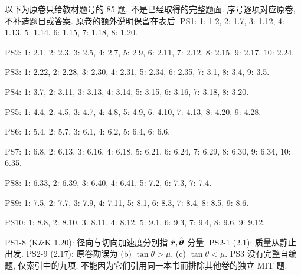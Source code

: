 以下为原卷只给教材题号的 85 题, 不是已经取得的完整题面. 序号逐项对应原卷, 不补造题目或答案. 原卷的额外说明保留在表后.
\noindent PS1: 1: 1.2, 2: 1.7, 3: 1.12, 4: 1.13, 5: 1.14, 6: 1.15, 7: 1.18, 8: 1.20.\par
\noindent PS2: 1: 2.1, 2: 2.3, 3: 2.5, 4: 2.7, 5: 2.9, 6: 2.11, 7: 2.12, 8: 2.15, 9: 2.17, 10: 2.24.\par
\noindent PS3: 1: 2.22, 2: 2.28, 3: 2.30, 4: 2.31, 5: 2.34, 6: 2.35, 7: 3.1, 8: 3.4, 9: 3.5.\par
\noindent PS4: 1: 3.7, 2: 3.11, 3: 3.13, 4: 3.14, 5: 3.15, 6: 3.16, 7: 3.18, 8: 3.20.\par
\noindent PS5: 1: 4.4, 2: 4.5, 3: 4.7, 4: 4.8, 5: 4.9, 6: 4.10, 7: 4.13, 8: 4.20, 9: 4.28.\par
\noindent PS6: 1: 5.4, 2: 5.7, 3: 6.1, 4: 6.2, 5: 6.4, 6: 6.6.\par
\noindent PS7: 1: 6.8, 2: 6.13, 3: 6.16, 4: 6.18, 5: 6.21, 6: 6.24, 7: 6.29, 8: 6.30, 9: 6.34, 10: 6.35.\par
\noindent PS8: 1: 6.33, 2: 6.39, 3: 6.40, 4: 6.41, 5: 7.2, 6: 7.3, 7: 7.4.\par
\noindent PS9: 1: 7.5, 2: 7.7, 3: 7.9, 4: 7.11, 5: 8.1, 6: 8.3, 7: 8.4, 8: 8.5, 9: 8.6.\par
\noindent PS10: 1: 8.8, 2: 8.10, 3: 8.11, 4: 8.12, 5: 9.1, 6: 9.3, 7: 9.4, 8: 9.6, 9: 9.12.\par
PS1-8 (K\&K 1.20): 径向与切向加速度分别指 $\hat{\boldsymbol{r}},\hat{\boldsymbol{\theta}}$ 分量. PS2-1 (2.1): 质量从静止出发. PS2-9 (2.17): 原卷勘误为 (b) $\tan\theta>\mu$, (c) $\tan\theta<\mu$. PS3 没有完整自编题, 仅索引中的九项. 不能因为它们引用同一本书而排除其他卷的独立 MIT 题.
